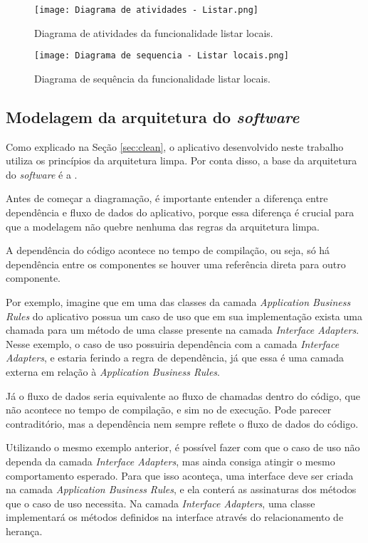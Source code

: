 \begin{figure}[!htb]
  \centering
  \texttt{[image: Diagrama de atividades - Listar.png]}
  \caption{Diagrama de atividades da funcionalidade listar locais.}
  \label{fig:atividadelistar}
\end{figure}

\begin{figure}[!htb]
  \centering
  \texttt{[image: Diagrama de sequencia - Listar locais.png]}
  \caption{Diagrama de sequência da funcionalidade listar locais.}
  \label{fig:sequencialistar}
\end{figure}

\subsection{Modelagem da arquitetura do \textit{software}}
Como explicado na Seção \ref{sec:clean}, o aplicativo desenvolvido neste trabalho utiliza os princípios da arquitetura limpa. Por conta disso, a base da arquitetura do \textit{software} é a .

Antes de começar a diagramação, é importante entender a diferença entre dependência e fluxo de dados do aplicativo, porque essa diferença é crucial para que a modelagem não quebre nenhuma das regras da arquitetura limpa.

A dependência do código acontece no tempo de compilação, ou seja, só há dependência entre os componentes se houver uma referência direta para outro componente.

Por exemplo, imagine que em uma das classes da camada \textit{Application Business Rules} do aplicativo possua um caso de uso que em sua implementação exista uma chamada para um método de uma classe presente na camada \textit{Interface Adapters}. Nesse exemplo, o caso de uso possuiria dependência com a camada \textit{Interface Adapters}, e estaria ferindo a regra de dependência, já que essa é uma camada externa em relação à \textit{Application Business Rules}.

Já o fluxo de dados seria equivalente ao fluxo de chamadas dentro do código, que não acontece no tempo de compilação, e sim no de execução. Pode parecer contraditório, mas a dependência nem sempre reflete o fluxo de dados do código.

Utilizando o mesmo exemplo anterior, é possível fazer com que o caso de uso não dependa da camada \textit{Interface Adapters}, mas ainda consiga atingir o mesmo comportamento esperado. Para que isso aconteça, uma interface deve ser criada na camada \textit{Application Business Rules}, e ela conterá as assinaturas dos métodos que o caso de uso necessita. Na camada \textit{Interface Adapters}, uma classe implementará os métodos definidos na interface através do relacionamento de herança.

